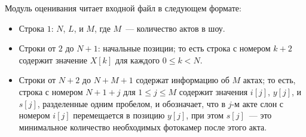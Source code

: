 Модуль оценивания читает входной файл в следующем формате:

\begin{itemize}
\item Строка $1$: $N$, $L$, и $M$, где $M$~--- количество актов в шоу.
\item Строки от $2$ до $N+1$: начальные позиции; то есть строка с номером $k+2$ содержит значение $X[k]$ для каждого $0 \le k < N$.
\item Строки от $N+2$ до $N+M+1$ содержат информацию об $M$ актах; то есть, строка с номером $N+1+j$ для $1 \le j \le M$ содержит значения $i[j]$, $y[j]$, и $s[j]$, разделенные одним пробелом, и обозначает, что в $j$-м акте слон с номером $i[j]$ перемещается в позицию $y[j]$, при этом $s[j]$~--- это минимальное количество необходимых фотокамер после этого акта. 
\end{itemize}
